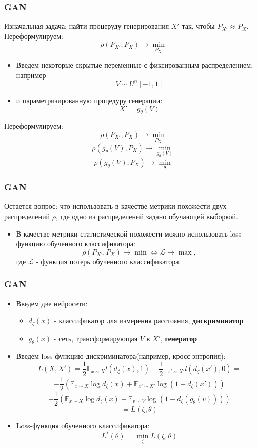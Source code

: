 \documentclass[9pt]{beamer}
\begin{document}
\begin{frame}\frametitle{GAN}
	Изначальная задача: найти процеруду генерирования $X'$ так, чтобы $ P_{X'} \approx P_X$.
	Переформулируем:
	$$ \rho(P_{X'}, P_X) \longrightarrow \underset{P_{X'}}{\min} $$
	\begin{itemize}
		\item Введем некоторые скрытые переменные с фиксированным распределением, например
		$$ V \sim U^n [-1, 1] $$
		\item и параметризированную процедуру генерации:
		$$ X' = g_{\theta}(V) $$
	\end{itemize}
	Переформулируем:
	$$ \rho(P_{X'}, P_X) \longrightarrow \underset{P_{X'}}{\min} $$
	$$ \rho(g_{\theta}(V), P_X) \longrightarrow \underset{g_{\theta}(V)}{\min} $$
	$$ \rho(g_{\theta}(V), P_X) \longrightarrow \underset{\theta}{\min} $$
\end{frame}

\begin{frame}\frametitle{GAN}
	Остается вопрос: что использовать в качестве метрики похожести двух распределений $\rho$, где одно из распределений задано обучающей выборкой.
	\begin{itemize}
		\item В качестве метрики статистической похожести можно использовать loss-функцию обученного классификатора:
		$$ \rho(P_{X'}, P_X) \longrightarrow \min \Leftrightarrow \mathcal{L} \longrightarrow \max, $$
		где $\mathcal{L}$ - функция потерь обученного классификатора.
	\end{itemize}
\end{frame}

\begin{frame}\frametitle{GAN}
	\begin{itemize}
		\item Введем две нейросети:
		\begin{itemize}
			\item $d_{\zeta}(x)$ - классификатор для измерения расстояния, \textbf{дискриминатор}
			\item $g_{\theta}(x)$ - сеть, трансформирующая $V$ в $X'$, \textbf{генератор}
		\end{itemize}
		\item Введем loss-функцию дискриминатора(например, кросс-энтропия):
		$$ L(X, X') = \frac{1}{2} \mathbb{E}_{x \sim X} l(d_{\zeta}(x), 1) + \frac{1}{2} \mathbb{E}_{x' \sim X'} l(d_{\zeta}(x'), 0) = $$
		 $$ = -\frac{1}{2} (\mathbb{E}_{x \sim X} \log d_{\zeta}(x) + \mathbb{E}_{x' \sim X'} \log (1 - d_{\zeta}(x'))) = $$
		 $$ =  -\frac{1}{2} (\mathbb{E}_{x \sim X} \log d_{\zeta}(x) + \mathbb{E}_{v \sim V} \log (1 - d_{\zeta}(g_{\theta}(v)))) = $$
		 $$ = L(\zeta, \theta) $$
		 \item Loss-функция обученного классификатора:
		 $$ L^*(\theta) = \underset{\zeta}{\min} L(\zeta, \theta) $$
	\end{itemize}
\end{frame}
\end{document}
